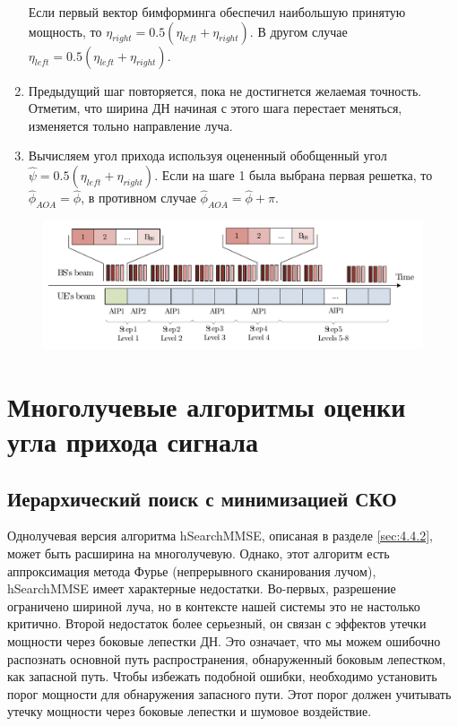 \begin{enumerate}[label=\textbf{Шаг \arabic*:}]
\begin{figure}[h!]
        \caption{}
        \label{fig:4.22}
    \end{figure}
    Если первый вектор бимформинга обеспечил наибольшую принятую мощность, то 
    $\eta_{right} = 0.5 (\eta_{left} + \eta_{right})$. 
    В другом случае 
    $\eta_{left} = 0.5 (\eta_{left} + \eta_{right})$.
    \item Предыдущий шаг повторяется, пока не достигнется желаемая точность. Отметим, что ширина ДН начиная с этого шага перестает меняться, изменяется тольно направление луча.
    \item Вычисляем угол прихода используя оцененный обобщенный угол $\hat \psi = 0.5 (\eta_{left} + \eta_{right})$. Если на шаге 1 была выбрана первая решетка, то 
    $\hat \phi_{AOA} = \hat \phi$, в противном случае $\hat \phi_{AOA} = \hat \phi + \pi$.
\end{enumerate}

\begin{figure}[h!]
    \centering
    \includegraphics[width=0.5\linewidth]{figs/fig4.23}
    \caption{}
    \label{fig:4.23}
\end{figure}


\section{Многолучевые алгоритмы оценки угла прихода сигнала}
\subsection{Иерархический поиск с минимизацией СКО}

Однолучевая версия алгоритма hSearchMMSE, описаная в разделе \ref{sec:4.4.2},
может быть расширина на многолучевую.  Однако, этот алгоритм есть аппроксимация
метода Фурье (непрерывного сканирования лучом), hSearchMMSE имеет характерные
недостатки.  Во-первых, разрешение ограничено шириной луча, но в контексте нашей
системы это не настолько критично. Второй недостаток более серьезный, он связан
с эффектов утечки мощности через боковые лепестки ДН.  Это означает, что мы
можем ошибочно распознать основной путь распространения, обнаруженный боковым
лепестком, как запасной путь.  Чтобы избежать подобной ошибки, необходимо
установить порог мощности для обнаружения запасного пути. Этот порог должен
учитывать утечку мощности через боковые лепестки и шумовое воздействие.

